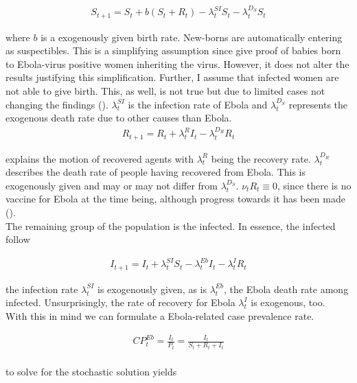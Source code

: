 \documentclass{article}
\begin{document}
\begin{align*}
S_{t+1} = S_t + b (S_t + R_t) - \lambda_t^{SI} S_t - \lambda_t^{D_S} S_t
\end{align*}

where $b$ is a exogenously given birth rate. New-borns are automatically entering as suspectibles. This is a simplifying assumption since \cite{dornemann2017first} give proof of babies born to Ebola-virus positive women inheriting the virus. However, it does not alter the results justifying this simplification. Further, I assume that infected women are not able to give birth. This, as well, is not true but due to limited cases not changing the findings (\cite{baggi2014management}). $\lambda_t^{SI}$ is the infection rate of Ebola and $\lambda_t^{D_S}$ represents the exogenous death rate due to other causes than Ebola. \\

\begin{align*}
R_{t+1} = R_t + \lambda_t^{R} I_t - \lambda_t^{D_R} R_t
\end{align*}

explains the motion of recovered agents with $\lambda_t^{R}$ being the recovery rate. $\lambda_t^{D_R}$ describes the death rate of people having recovered from Ebola. This is exogenously given and may or may not differ from $\lambda_t^{D_S}$. $\nu_t R_t \equiv 0$, since there is no vaccine for Ebola at the time being, although progress towards it has been made (\cite{ledgerwood2017chimpanzee}).\\
The remaining group of the population is the infected. In essence, the infected follow

\begin{align*}
I_{t+1} = I_t + \lambda_t^{SI} S_t - \lambda_t^{Eb} I_t - \lambda_t^{I} R_t
\end{align*}

the infection rate $\lambda_t^{SI}$ is exogenously given, as is $\lambda_t^{Eb}$, the Ebola death rate among infected. Unsurprisingly, the rate of recovery for Ebola $\lambda_t^{I}$ is exogenous, too. \\
With this in mind we can formulate a Ebola-related case prevalence rate.

\begin{align*}
CP_{t}^{Eb} = \frac{I_t}{P_t} = \frac{I_t}{S_t + R_t + I_t} \\
\end{align*} 

to solve for the stochastic solution yields
\end{document}

